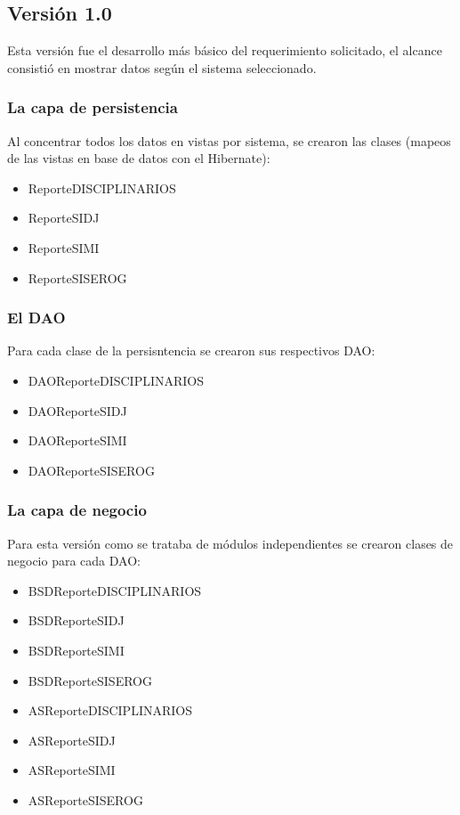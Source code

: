 \documentclass[../reportesINE.tex]{subfiles}
\begin{document}
\subsection{Versión 1.0}
Esta versión fue el desarrollo más básico del requerimiento solicitado, el alcance consistió en mostrar datos según el sistema seleccionado. 

\subsubsection{La capa de persistencia}
Al concentrar todos los datos en vistas por sistema, se crearon las clases (mapeos de las vistas en base de datos con el Hibernate): 
\begin{itemize}
\item ReporteDISCIPLINARIOS
\item ReporteSIDJ
\item ReporteSIMI
\item ReporteSISEROG
\end{itemize}

\subsubsection{El DAO}
Para cada clase de la persisntencia se crearon sus respectivos DAO:  
\begin{itemize}
\item DAOReporteDISCIPLINARIOS
\item DAOReporteSIDJ
\item DAOReporteSIMI
\item DAOReporteSISEROG
\end{itemize}

\subsubsection{La capa de negocio}
Para esta versión como se trataba de módulos independientes se crearon clases de negocio para cada DAO:
\begin{itemize}
\item BSDReporteDISCIPLINARIOS
\item BSDReporteSIDJ
\item BSDReporteSIMI
\item BSDReporteSISEROG
\item ASReporteDISCIPLINARIOS
\item ASReporteSIDJ
\item ASReporteSIMI
\item ASReporteSISEROG
\end{itemize}
\end{document}
